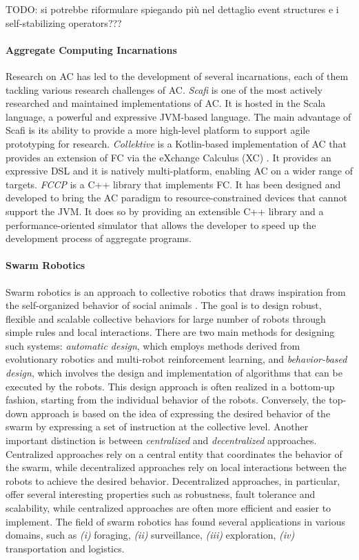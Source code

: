 \documentclass[12pt]{article}
\begin{document}
TODO: si potrebbe riformulare spiegando più nel dettaglio event structures e i self-stabilizing operators???

\paragraph{\textbf{Aggregate Computing Incarnations}} Research on AC has led to the development of several incarnations, each of them tackling various research challenges of AC.
\textit{Scafi}\cite{casadei2016towards} is one of the most actively researched and maintained implementations of
AC. It is hosted in the Scala language, a powerful and expressive JVM-based language. The main advantage of Scafi is its ability to provide a
more high-level platform to support agile prototyping for research. \textit{Collektive} is a Kotlin-based implementation of AC that provides an extension of FC via the eXchange Calculus (XC) \cite{audrito2024exchange}.
It provides an expressive DSL and it is natively multi-platform, enabling AC on a wider range of targets.
\textit{FCCP}\cite{audrito2024fcpp} is a C++ library that implements FC. It has been designed and developed to bring the AC paradigm to
resource-constrained devices that cannot support the JVM. It does so by providing an extensible C++ library and a performance-oriented simulator that allows
the developer to speed up the development process of aggregate programs.

\paragraph{\textbf{Swarm Robotics}} Swarm robotics is an approach to collective robotics that draws inspiration from the self-organized behavior of social animals \cite{brambilla2013swarm}. The goal is to design robust, flexible and scalable 
collective behaviors for large number of robots through simple rules and local interactions. There are two main methods for designing such systems: \textit{automatic design}, which employs methods derived from
evolutionary robotics and multi-robot reinforcement learning, and \textit{behavior-based design}, which involves the design and implementation of algorithms that can be executed by the robots. This design approach is often realized
in a bottom-up fashion, starting from the individual behavior of the robots. Conversely, the top-down approach is based on the idea of expressing the desired behavior of the swarm by expressing a set of instruction at the collective level.
Another important distinction is between \textit{centralized} and \textit{decentralized} approaches. Centralized approaches rely on a central entity that coordinates the behavior of the swarm, while decentralized approaches rely on local interactions between the robots to achieve the desired behavior.
Decentralized approaches, in particular, offer several interesting properties such as robustness, fault tolerance and scalability, while centralized approaches are often more efficient and easier to implement.
The field of swarm robotics has found several applications in various domains, such as \textit{(i)} foraging, \textit{(ii)} surveillance, \textit{(iii)} exploration, \textit{(iv)} transportation and logistics.
\end{document}
